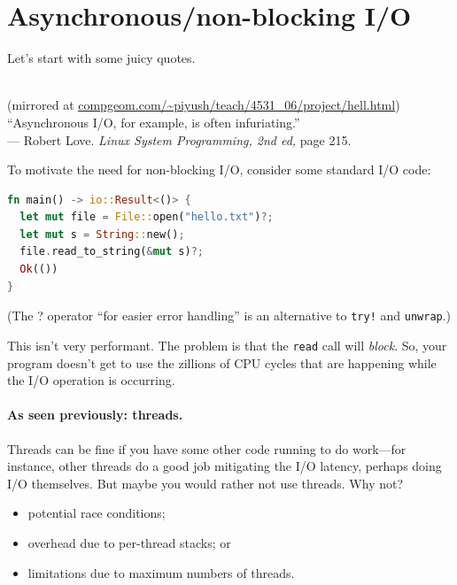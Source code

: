 




\section*{Asynchronous/non-blocking I/O}

Let's start with some juicy quotes.

\begin{center}
  \\
{\scriptsize (mirrored at \url{compgeom.com/~piyush/teach/4531_06/project/hell.html})}
   \\[2em]

   ``Asynchronous I/O, for example, is often infuriating.''\\
\hfill --- Robert Love. {\em Linux System Programming, 2nd ed, } page 215.

\end{center}

To motivate the need for non-blocking I/O, consider some standard I/O code:

\begin{lstlisting}[language=Rust]
fn main() -> io::Result<()> {
  let mut file = File::open("hello.txt")?;
  let mut s = String::new();
  file.read_to_string(&mut s)?;
  Ok(()) 
}
\end{lstlisting}
(The ? operator ``for easier error handling'' is an alternative to
\texttt{try!} and \texttt{unwrap}.)

This isn't very performant. The problem is that the {\tt read} call will
{\em block}. So, your program doesn't get to use the zillions of CPU cycles that
are happening while the I/O operation is occurring.

\paragraph{As seen previously: threads.} Threads can be fine if
you have some other code running to do work---for instance, other threads
do a good job mitigating the I/O latency, perhaps doing I/O themselves.
But maybe you would rather not use threads. Why not?
\begin{itemize}[noitemsep,topsep=-1em]
\item potential race conditions;
\item overhead due to per-thread stacks; or
\item limitations due to maximum numbers of threads.
\end{itemize}

